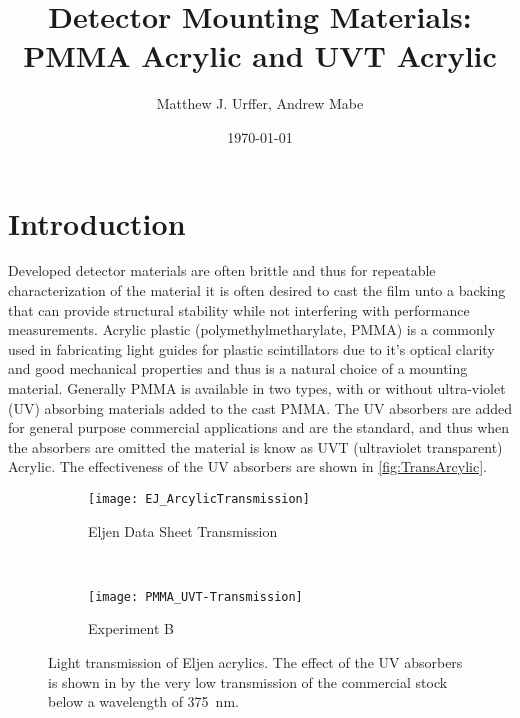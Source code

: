 \documentclass[draftcls,onecolumn]{IEEEtran}
\begin{document}
\title{Detector Mounting Materials: PMMA Acrylic and UVT Acrylic}
\author{Matthew J. Urffer, Andrew Mabe}
\date{\today}
\maketitle

\tableofcontents
\listoffigures
\listoftables
\section{Introduction}
Developed detector materials are often brittle and thus for repeatable characterization of the material it is often desired to cast the film unto a backing that can provide structural stability while not interfering with performance measurements.
Acrylic plastic (polymethylmetharylate, PMMA) is a commonly used in fabricating light guides for plastic scintillators due to it's optical clarity and good mechanical properties and thus is a natural choice of a mounting material.
Generally PMMA is available in two types, with or without ultra-violet (UV) absorbing materials added to the cast PMMA.
The UV absorbers are added for general purpose commercial applications and are the standard, and thus when the absorbers are omitted the material is know as UVT (ultraviolet transparent) Acrylic.
The effectiveness of the UV absorbers are shown in \autoref{fig:TransArcylic}.
\begin{figure}[hb]
  \centering
 \begin{subfigure}[b]{0.45\textwidth}
    \centering
    \texttt{[image: EJ\_ArcylicTransmission]}
    \caption{Eljen Data Sheet Transmission}
  \end{subfigure}%
  ~
  \begin{subfigure}[b]{0.45\textwidth}
    \centering
    \texttt{[image: PMMA\_UVT-Transmission]}
    \caption{Experiment B}
  \end{subfigure}
  \caption[Light Transmission of Eljen Acrylics]{Light transmission of Eljen acrylics.  The effect of the UV absorbers is shown in by the very low transmission of the commercial stock below a wavelength of \SI{375}{\nm}.}
	\label{fig:TransArcylic}
\end{figure}	
\end{document}
